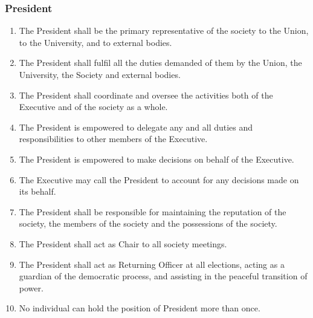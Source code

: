 \documentclass[parskip=half]{scrartcl}
\begin{document}
            \subsubsection{President}
                \label{executive--executive-positions--president}
                \begin{enumerate}
                    \item The President shall be the primary representative of the society to the Union, to the University, and to external bodies.
                    
                    \item The President shall fulfil all the duties demanded of them by the Union, the University, the Society and external bodies.
                    
                    \item The President shall coordinate and oversee the activities both of the Executive and of the society as a whole.
                    
                    \item The President is empowered to delegate any and all duties and responsibilities to other members of the Executive.
                    
                    \item The President is empowered to make decisions on behalf of the Executive.
                    
                    \item The Executive may call the President to account for any decisions made on its behalf.
                    
                    \item The President shall be responsible for maintaining the reputation of the society, the members of the society and the possessions of the society.

                    \item The President shall act as Chair to all society meetings.
                   
                    \item The President shall act as Returning Officer at all elections, acting as a guardian of the democratic process, and assisting in the peaceful transition of power.
                    
                    \item No individual can hold the position of President more than once.
                \end{enumerate}
            
\end{document}
